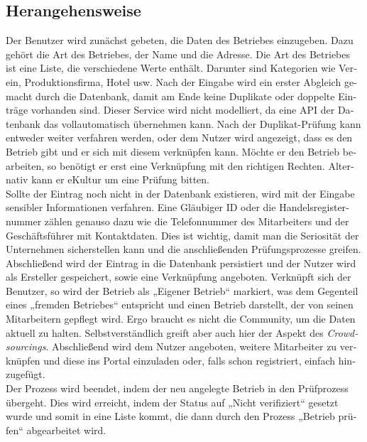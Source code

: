 \begin{otherlanguage}{german}
\section*{Herangehensweise}
Der Benutzer wird zunächst gebeten, die Daten des Betriebes einzugeben. Dazu gehört die Art des Betriebes, der Name und die Adresse. Die Art des Betriebes ist eine Liste, die verschiedene Werte enthält. Darunter sind Kategorien wie Verein, Produktionsfirma, Hotel usw. 
Nach der Eingabe wird ein erster Abgleich gemacht durch die Datenbank, damit am Ende keine Duplikate oder doppelte Einträge vorhanden sind. Dieser Service wird nicht modelliert, da eine API der Datenbank das vollautomatisch übernehmen kann. 
Nach der Duplikat-Prüfung kann entweder weiter verfahren werden, oder dem Nutzer wird angezeigt, dass es den Betrieb gibt und er sich mit diesem verknüpfen kann. Möchte er den Betrieb bearbeiten, so benötigt er erst eine Verknüpfung mit den richtigen Rechten. Alternativ kann er eKultur um eine Prüfung bitten. \\
Sollte der Eintrag noch nicht in der Datenbank existieren, wird mit der Eingabe sensibler Informationen verfahren. Eine Gläubiger ID oder die Handelsregisternummer zählen genauso dazu wie die Telefonnummer des Mitarbeiters und der Geschäftsführer mit Kontaktdaten. Dies ist wichtig, damit man die Seriosität der Unternehmen sicherstellen kann und die anschließenden Prüfungsprozesse greifen. \\
Abschließend wird der Eintrag in die Datenbank persistiert und der Nutzer wird als Ersteller gespeichert, sowie eine Verknüpfung angeboten. Verknüpft sich der Benutzer, so wird der Betrieb als „Eigener Betrieb“ markiert, was dem Gegenteil eines „fremden Betriebes“ entspricht und einen Betrieb darstellt, der von seinen Mitarbeitern gepflegt wird. Ergo braucht es nicht die Community, um die Daten aktuell zu halten. Selbstverständlich greift aber auch hier der Aspekt des \textit{Crowdsourcings}. 
Abschließend wird dem Nutzer angeboten, weitere Mitarbeiter zu verknüpfen und diese ins Portal einzuladen oder, falls schon registriert, einfach hinzugefügt. \\
Der Prozess wird beendet, indem der neu angelegte Betrieb in den Prüfprozess übergeht. Dies wird erreicht, indem der Status auf „Nicht verifiziert“ gesetzt wurde und  somit in eine Liste kommt, die dann durch den Prozess „Betrieb prüfen“ abgearbeitet wird. 
\end{otherlanguage}
